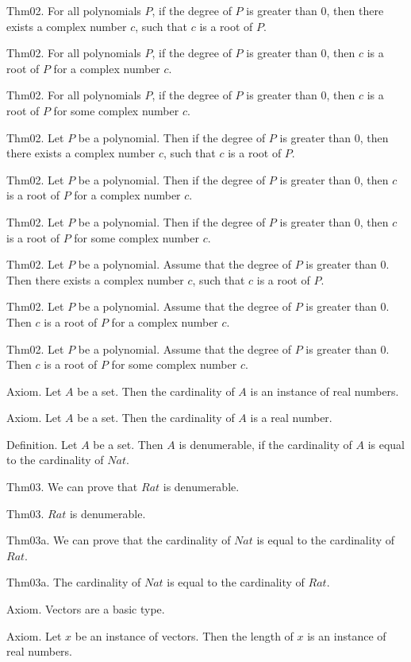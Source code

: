 \documentclass{article}
\begin{document}
Thm02. For all polynomials $P$, if the degree of $P$ is greater than $0$, then there exists a complex number $c$, such that $c$ is a root of $P$.

Thm02. For all polynomials $P$, if the degree of $P$ is greater than $0$, then $c$ is a root of $P$ for a complex number $c$.

Thm02. For all polynomials $P$, if the degree of $P$ is greater than $0$, then $c$ is a root of $P$ for some complex number $c$.

Thm02. Let $P$ be a polynomial. Then if the degree of $P$ is greater than $0$, then there exists a complex number $c$, such that $c$ is a root of $P$.

Thm02. Let $P$ be a polynomial. Then if the degree of $P$ is greater than $0$, then $c$ is a root of $P$ for a complex number $c$.

Thm02. Let $P$ be a polynomial. Then if the degree of $P$ is greater than $0$, then $c$ is a root of $P$ for some complex number $c$.

Thm02. Let $P$ be a polynomial. Assume that the degree of $P$ is greater than $0$. Then there exists a complex number $c$, such that $c$ is a root of $P$.

Thm02. Let $P$ be a polynomial. Assume that the degree of $P$ is greater than $0$. Then $c$ is a root of $P$ for a complex number $c$.

Thm02. Let $P$ be a polynomial. Assume that the degree of $P$ is greater than $0$. Then $c$ is a root of $P$ for some complex number $c$.

Axiom. Let $A$ be a set. Then the cardinality of $A$ is an instance of real numbers.

Axiom. Let $A$ be a set. Then the cardinality of $A$ is a real number.

Definition. Let $A$ be a set. Then $A$ is denumerable, if the cardinality of $A$ is equal to the cardinality of $Nat$.

Thm03. We can prove that $Rat$ is denumerable.

Thm03. $Rat$ is denumerable.

Thm03a. We can prove that the cardinality of $Nat$ is equal to the cardinality of $Rat$.

Thm03a. The cardinality of $Nat$ is equal to the cardinality of $Rat$.

Axiom. Vectors are a basic type.

Axiom. Let $x$ be an instance of vectors. Then the length of $x$ is an instance of real numbers.
\end{document}
